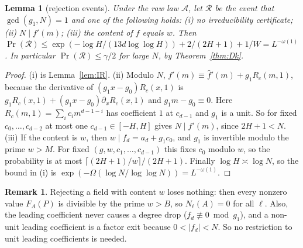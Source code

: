 \documentclass[11pt]{amsart}
\newtheorem{lemma}[theorem]{Lemma}
\theoremstyle{definition}
\newtheorem{remark}[theorem]{Remark}
\newcommand{\cA}{\mathcal{A}}
\newcommand{\cR}{\mathcal{R}}
\newcommand{\Prob}{\Pr}
\begin{document}
\begin{lemma}[rejection events]\label{lem:reject}
Under the raw law $\cA$, let $\cR$ be the event that $\gcd(g_1,N)=1$ and one of the following holds: (i) no irreducibility certificate; (ii) $N\mid f'(m)$; (iii) the
content of $f$ equals $w$. Then $\Prob(\cR)\le\exp(-\log H/(13d\log\log H))+2/(2H+1)+1/W=L^{-\omega(1)}$. In particular $\Prob(\cR)\le\gamma/2$
for large $N$, by Theorem~\ref{thm:Dk}.
\end{lemma}

\begin{proof}
(i) is Lemma~\ref{lem:IR}. (ii) Modulo $N$, $f'(m)\equiv\hat f'(m)+g_1R_c(m,1)$, because the derivative of $(g_1x-g_0)R_c(x,1)$ is
$g_1R_c(x,1)+(g_1x-g_0)\partial_xR_c(x,1)$ and $g_1m-g_0\equiv0$. Here $R_c(m,1)=\sum_ic_im^{d-1-i}$ has coefficient $1$ at $c_{d-1}$ and $g_1$ is a
unit. So for fixed $c_0,\dots,c_{d-2}$ at most one $c_{d-1}\in[-H,H]$ gives $N\mid f'(m)$, since $2H+1<N$. (iii) If the content is $w$, then
$w\mid f_d=a_d+g_1c_0$, and $g_1$ is invertible modulo the prime $w>M$. For fixed $(g,w,c_1,\dots,c_{d-1})$ this fixes $c_0$ modulo $w$, so
the probability is at most $\lceil(2H+1)/w\rceil/(2H+1)$. Finally $\log H\asymp\log N$, so the bound in (i) is $\exp(-\Omega(\log N/\log\log N))=L^{-\omega(1)}$.
\end{proof}

\begin{remark}
Rejecting a field with content $w$ loses nothing: then every nonzero value $F_A(P)$ is divisible by the prime $w>B$, so
$N_\ell(A)=0$ for all $\ell$. Also, the leading coefficient never causes a degree drop ($f_d\not\equiv0\bmod g_1$), and a non-unit
leading coefficient is a factor exit because $0<|f_d|<N$. So no restriction to unit leading coefficients is needed.
\end{remark}
\end{document}
